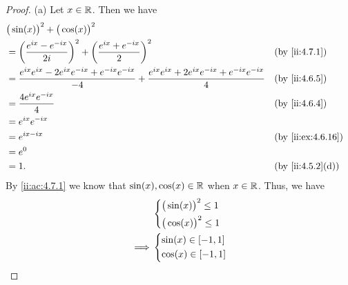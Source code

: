 \begin{proof}{(a)}
  Let \(x \in \mathbb{R}\).
  Then we have
  \begin{align*}
     & \big(\sin(x)\big)^2 + \big(\cos(x)\big)^2                                                                                                                                 \\
     & = \bigg(\dfrac{e^{i x} - e^{- i x}}{2i}\bigg)^2 + \bigg(\dfrac{e^{i x} + e^{- i x}}{2}\bigg)^2                                                     &  & \by{ii:4.7.1}     \\
     & = \dfrac{e^{i x} e^{i x} - 2 e^{i x} e^{- i x} + e^{- i x} e^{- i x}}{-4} + \dfrac{e^{i x} e^{i x} + 2 e^{i x} e^{- i x} + e^{- i x} e^{- i x}}{4} &  & \by{ii:4.6.5}     \\
     & = \dfrac{4 e^{i x} e^{- i x}}{4}                                                                                                                   &  & \by{ii:4.6.4}     \\
     & = e^{i x} e^{- i x}                                                                                                                                                       \\
     & = e^{i x - i x}                                                                                                                                    &  & \by{ii:ex:4.6.16} \\
     & = e^0                                                                                                                                                                     \\
     & = 1.                                                                                                                                               &  & \by{ii:4.5.2}[d]
  \end{align*}
  By \cref{ii:ac:4.7.1} we know that \(\sin(x), \cos(x) \in \mathbb{R}\) when \(x \in \mathbb{R}\).
  Thus, we have
  \begin{align*}
             & \begin{dcases}
                 \big(\sin(x)\big)^2 \leq 1 \\
                 \big(\cos(x)\big)^2 \leq 1
               \end{dcases} \\
    \implies & \begin{dcases}
                 \sin(x) \in [-1, 1] \\
                 \cos(x) \in [-1, 1]
               \end{dcases}
  \end{align*}
\end{proof}

